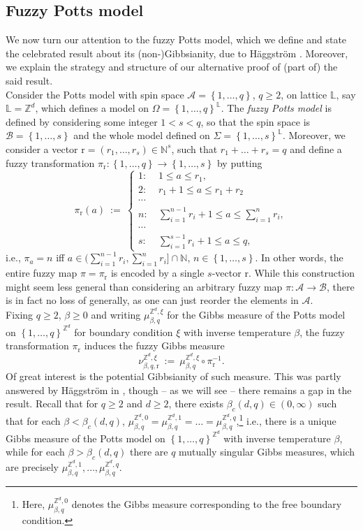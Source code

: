 \documentclass[12pt]{article}
\newcommand{\A}{\mathcal{A}}
\newcommand{\B}{\mathcal{B}}
\renewcommand{\L}{\mathbb{L}}
\newcommand{\N}{\mathbb{N}}
\renewcommand{\r}{\mathrm{r}}
\newcommand{\Z}{\mathbb{Z}}
\newcommand{\set}[1]{\left\{#1\right\}}
\newcommand{\ra}{\rightarrow}
\newcommand{\1}{\mathbbm{1}}
\newcommand{\5}{\vspace{0.5cm}}
\theoremstyle{definition}
\begin{document}

\subsection{Fuzzy Potts model}

We now turn our attention to the fuzzy Potts model, which we define and state the celebrated result about its (non-)Gibbsianity, due to H\"aggstr\"om \cite{Hag}. Moreover, we explain the strategy and structure of our alternative proof of (part of) the said result. \\

Consider the Potts model with spin space $\A=\set{1,\ldots,q}$, $q\geq 2$, on lattice $\L$, say $\L=\Z^d$, which defines a model on $\Omega=\set{1,\ldots,q}^\L$. The \textit{fuzzy Potts model} is defined by considering some integer $1<s<q$, so that the spin space is $\B=\set{1,\ldots,s}$ and the whole model defined on $\Sigma=\set{1,\ldots,s}^\L$. Moreover, we consider a vector $\r=(r_1,\ldots,r_s)\in\N^s$, such that $r_1+\ldots+r_s=q$ and define a fuzzy transformation $\pi_\r:\set{1,\ldots,q}\ra\set{1,\ldots,s}$ by putting 
$$\pi_\r(a) ~:=~ \begin{cases}
1: ~&1\leq a\leq r_1,\\
2: ~&r_1+1\leq a\leq r_1+r_2 \\
\cdots \\
n: ~&\sum_{i=1}^{n-1} r_i + 1\leq a\leq \sum_{i=1}^n r_i,\\
\cdots \\
s: ~&\sum_{i=1}^{s-1}r_i + 1\leq a\leq q,
\end{cases}$$
i.e., $\pi_a=n$ iff $a\in(\sum_{i=1}^{n-1}r_i,\sum_{i=1}^n r_i]\cap \N$, $n\in\set{1,\ldots,s}$. In other words, the entire fuzzy map $\pi=\pi_\r$ is encoded by a single $s$-vector $\r$. While this construction might seem less general than considering an arbitrary fuzzy map $\pi:\A\ra\B$, there is in fact no loss of generally, as one can just reorder the elements in $\A$. \\

Fixing $q\geq 2$, $\beta\geq 0$ and writing $\mu_{\beta,q}^{\Z^d,\xi}$ for the Gibbs measure of the Potts model on $\set{1,\ldots,q}^{\Z^d}$ for boundary condition $\xi$ with inverse temperature $\beta$, the fuzzy transformation $\pi_\r$ induces the fuzzy Gibbs measure 
$$\nu_{\beta,q,\r}^{\Z^d,\xi} ~:=~ \mu_{\beta,q}^{\Z^d,\xi}\circ\pi_\r^{-1}.$$
Of great interest is the potential Gibbsianity of such measure. This was partly answered by H\"aggstr\"om in \cite{Hag}, though -- as we will see -- there remains a gap in the result. Recall that for $q\geq 2$ and $d\geq 2$, there exists $\beta_c(d,q)\in(0,\infty)$ such that for each $\beta<\beta_c(d,q)$, $\mu_{\beta,q}^{\Z^d,0}=\mu_{\beta,q}^{\Z^d,1}=\ldots=\mu_{\beta,q}^{\Z^d,q}$,\footnote{Here, $\mu_{\beta,q}^{\Z^d,0}$ denotes the Gibbs measure corresponding to the free boundary condition.} i.e., there is a unique Gibbs measure of the Potts model on $\set{1,\ldots,q}^{\Z^d}$ with inverse temperature $\beta$, while for each $\beta>\beta_c(d,q)$ there are $q$ mutually singular Gibbs measures, which are precisely $\mu_{\beta,q}^{\Z^d,1},\ldots,\mu_{\beta,q}^{\Z^d,q}$.
\end{document}
